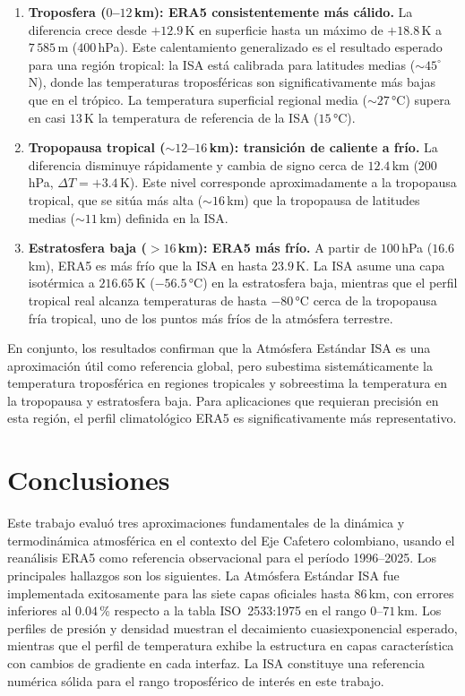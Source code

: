 \documentclass[12pt, a4paper]{article}
\begin{document}
\begin{enumerate}
	\item \textbf{Troposfera ($0$--$12$\,km): ERA5 consistentemente
		más cálido.} La diferencia crece desde $+12.9$\,K en
	superficie hasta un máximo de $+18.8$\,K a $7\,585$\,m
	($400$\,hPa). Este calentamiento generalizado es el resultado
	esperado para una región tropical: la ISA está calibrada para
	latitudes medias ($\sim\!45^{\circ}$\,N), donde las
	temperaturas troposféricas son significativamente más bajas
	que en el trópico. La temperatura superficial regional media
	($\sim\!27$\,°C) supera en casi $13$\,K la temperatura de
	referencia de la ISA ($15$\,°C).
	
	\item \textbf{Tropopausa tropical ($\sim\!12$--$16$\,km):
		transición de caliente a frío.} La diferencia disminuye
	rápidamente y cambia de signo cerca de $12.4$\,km
	($200$\,hPa, $\Delta T = +3.4$\,K). Este nivel corresponde
	aproximadamente a la tropopausa tropical, que se sitúa más
	alta ($\sim\!16$\,km) que la tropopausa de latitudes medias
	($\sim\!11$\,km) definida en la ISA.
	
	\item \textbf{Estratosfera baja ($>\!16$\,km): ERA5 más frío.}
	A partir de $100$\,hPa ($16.6$\,km), ERA5 es más frío que la
	ISA en hasta $23.9$\,K. La ISA asume una capa isotérmica a
	$216.65$\,K ($-56.5$\,°C) en la estratosfera baja, mientras
	que el perfil tropical real alcanza temperaturas de hasta
	$-80$\,°C cerca de la tropopausa fría tropical, uno de los
	puntos más fríos de la atmósfera terrestre.
\end{enumerate}

En conjunto, los resultados confirman que la Atmósfera Estándar
ISA es una aproximación útil como referencia global, pero
subestima sistemáticamente la temperatura troposférica en
regiones tropicales y sobreestima la temperatura en la
tropopausa y estratosfera baja. Para aplicaciones que requieran
precisión en esta región, el perfil climatológico ERA5 es
significativamente más representativo.

\section{Conclusiones}
\label{sec:conclusiones}

Este trabajo evaluó tres aproximaciones fundamentales de la
dinámica y termodinámica atmosférica en el contexto del Eje
Cafetero colombiano, usando el reanálisis ERA5 como referencia
observacional para el período 1996--2025. Los principales
hallazgos son los siguientes. La Atmósfera Estándar ISA fue implementada exitosamente
para las siete capas oficiales hasta $86$\,km, con errores
inferiores al $0.04$\,\% respecto a la tabla ISO~2533:1975 en
el rango $0$--$71$\,km. Los perfiles de presión y densidad
muestran el decaimiento cuasiexponencial esperado, mientras
que el perfil de temperatura exhibe la estructura en capas
característica con cambios de gradiente en cada interfaz.
La ISA constituye una referencia numérica sólida para el
rango troposférico de interés en este trabajo.
\end{document}
